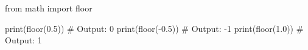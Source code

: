 \begin{unipdcode}[language=Python,numbers=none,xleftmargin=0pt,framexleftmargin=0pt]
from math import floor

print(floor(0.5))   # Output: 0
print(floor(-0.5))  # Output: -1
print(floor(1.0))   # Output: 1
\end{unipdcode}
